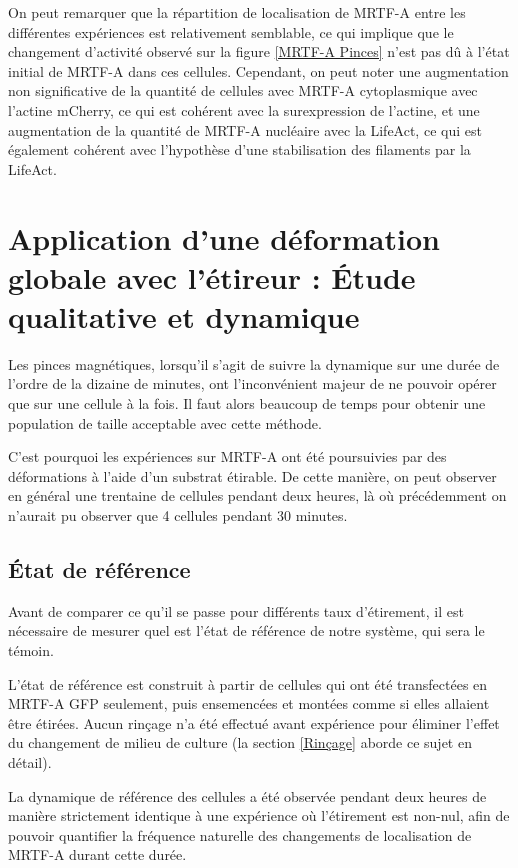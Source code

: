 \documentclass{report}
\begin{document}
On peut remarquer que la répartition de localisation de MRTF-A entre les différentes expériences est relativement semblable, ce qui implique que le changement d'activité observé sur la figure \ref{MRTF-A Pinces} n'est pas dû à l'état initial de MRTF-A dans ces cellules. 
Cependant, on peut noter une augmentation non significative de la quantité de cellules avec MRTF-A cytoplasmique avec l'actine mCherry, ce qui est cohérent avec la surexpression de l'actine, et une augmentation de la quantité de MRTF-A nucléaire avec la LifeAct, ce qui est également cohérent avec l'hypothèse d'une stabilisation des filaments par la LifeAct. 

\section{Application d'une déformation globale avec l'étireur : \'Etude qualitative et dynamique}

Les pinces magnétiques, lorsqu'il s'agit de suivre la dynamique sur une durée de l'ordre de la dizaine de minutes, ont l'inconvénient majeur de ne pouvoir opérer que sur une cellule à la fois. 
Il faut alors beaucoup de temps pour obtenir une population de taille acceptable avec cette méthode. 

C'est pourquoi les expériences sur MRTF-A ont été poursuivies par des déformations à l'aide d'un substrat étirable. De cette manière, on peut observer en général une trentaine de cellules pendant deux heures, là où précédemment on n'aurait pu observer que 4 cellules pendant 30 minutes. 



\subsection{\'Etat de référence}

Avant de comparer ce qu'il se passe pour différents taux d'étirement, il est nécessaire de mesurer quel est l'état de référence de notre système, qui sera le témoin. 

L'état de référence est construit à partir de cellules qui ont été transfectées en MRTF-A GFP seulement, puis ensemencées et montées comme si elles allaient être étirées. 
Aucun rinçage n'a été effectué avant expérience pour éliminer l'effet du changement de milieu de culture (la section \ref{Rinçage} aborde ce sujet en détail). 

La dynamique de référence des cellules a été observée pendant deux heures de manière strictement identique à une expérience où l'étirement est non-nul, afin de pouvoir quantifier la fréquence naturelle des changements de localisation de MRTF-A durant cette durée. 
\end{document}
